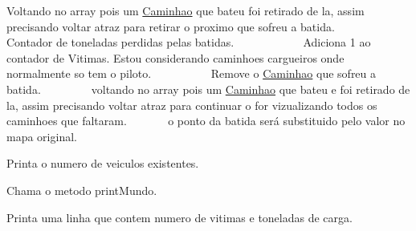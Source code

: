 Voltando no array pois um \mbox{\hyperlink{class_caminhao}{Caminhao}} que bateu foi retirado de la, assim precisando voltar atraz para retirar o proximo que sofreu a batida. ~\newline
~\newline
~\newline
~\newline
~\newline
~\newline
~\newline
~\newline
 Contador de toneladas perdidas pelas batidas. ~\newline
~\newline
~\newline
~\newline
~\newline
~\newline
~\newline
 Adiciona 1 ao contador de Vitimas. Estou considerando caminhoes cargueiros onde normalmente so tem o piloto. ~\newline
~\newline
~\newline
~\newline
~\newline
~\newline
 Remove o \mbox{\hyperlink{class_caminhao}{Caminhao}} que sofreu a batida. ~\newline
~\newline
~\newline
~\newline
~\newline
 voltando no array pois um \mbox{\hyperlink{class_caminhao}{Caminhao}} que bateu e foi retirado de la, assim precisando voltar atraz para continuar o for vizualizando todos os caminhoes que faltaram. ~\newline
~\newline
~\newline
~\newline
 o ponto da batida será substituido pelo valor no mapa original.

Printa o numero de veiculos existentes.

Chama o metodo print\+Mundo.

Printa uma linha que contem numero de vitimas e toneladas de carga. \mbox{\label{class_mundo_abe2d4fb96005c19b423cc6163bf986f5}} 
